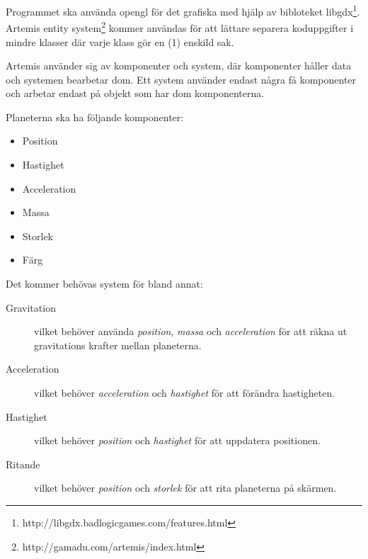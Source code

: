Programmet ska använda opengl för det grafiska med hjälp av bibloteket
libgdx\footnote{http://libgdx.badlogicgames.com/features.html}.
Artemis entity system\footnote{http://gamadu.com/artemis/index.html}
kommer användas för att lättare separera koduppgifter i mindre
klasser där varje klass gör en (1) enskild sak.

Artemis använder sig av komponenter och system,
där komponenter håller data och systemen bearbetar dom.
Ett system använder endast några få komponenter och
arbetar endast på objekt som har dom komponenterna.

Planeterna ska ha följande komponenter:
\begin{itemize}
    \item Position
    \item Hastighet
    \item Acceleration
    \item Massa
    \item Storlek
    \item Färg
\end{itemize}

Det kommer behövas system för bland annat:
\begin{description}
    \item[Gravitation] vilket behöver använda
        \textit{position}, \textit{massa} och \textit{acceleration}
        för att räkna ut gravitations krafter mellan planeterna.
    \item [Acceleration] vilket behöver \textit{acceleration} och \textit{hastighet}
        för att förändra hastigheten.
    \item [Hastighet] vilket behöver \textit{position} och \textit{hastighet}
        för att uppdatera positionen.
    \item [Ritande] vilket behöver \textit{position} och \textit{storlek}
        för att rita planeterna på skärmen.
\end{description}

